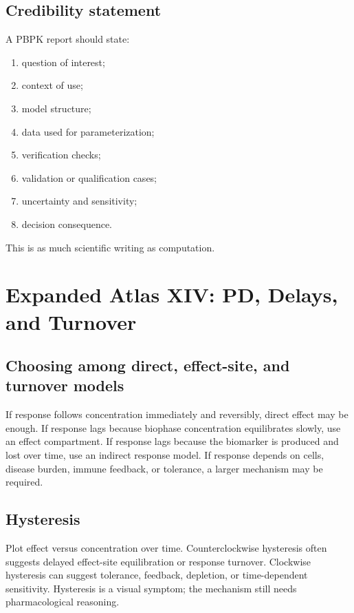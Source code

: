 \subsection{Credibility statement}

A PBPK report should state:
\begin{enumerate}[leftmargin=2em]
  \item question of interest;
  \item context of use;
  \item model structure;
  \item data used for parameterization;
  \item verification checks;
  \item validation or qualification cases;
  \item uncertainty and sensitivity;
  \item decision consequence.
\end{enumerate}
This is as much scientific writing as computation.

\section{Expanded Atlas XIV: PD, Delays, and Turnover}

\subsection{Choosing among direct, effect-site, and turnover models}

If response follows concentration immediately and reversibly, direct effect may be enough. If response lags because biophase concentration equilibrates slowly, use an effect compartment. If response lags because the biomarker is produced and lost over time, use an indirect response model. If response depends on cells, disease burden, immune feedback, or tolerance, a larger mechanism may be required.

\subsection{Hysteresis}

Plot effect versus concentration over time. Counterclockwise hysteresis often suggests delayed effect-site equilibration or response turnover. Clockwise hysteresis can suggest tolerance, feedback, depletion, or time-dependent sensitivity. Hysteresis is a visual symptom; the mechanism still needs pharmacological reasoning.

